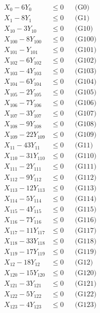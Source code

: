 \documentclass[a4paper,10pt]{article}
\begin{document}
\allowdisplaybreaks
{\small\begin{align}
X_{0} - 6Y_{0} &\leq 0 && \text{(G0)} \\
X_{1} - 8Y_{1} &\leq 0 && \text{(G1)} \\
X_{10} - 3Y_{10} &\leq 0 && \text{(G10)} \\
X_{100} - 8Y_{100} &\leq 0 && \text{(G100)} \\
X_{101} - Y_{101} &\leq 0 && \text{(G101)} \\
X_{102} - 6Y_{102} &\leq 0 && \text{(G102)} \\
X_{103} - 4Y_{103} &\leq 0 && \text{(G103)} \\
X_{104} - 6Y_{104} &\leq 0 && \text{(G104)} \\
X_{105} - 2Y_{105} &\leq 0 && \text{(G105)} \\
X_{106} - 7Y_{106} &\leq 0 && \text{(G106)} \\
X_{107} - 3Y_{107} &\leq 0 && \text{(G107)} \\
X_{108} - 9Y_{108} &\leq 0 && \text{(G108)} \\
X_{109} - 22Y_{109} &\leq 0 && \text{(G109)} \\
X_{11} - 43Y_{11} &\leq 0 && \text{(G11)} \\
X_{110} - 31Y_{110} &\leq 0 && \text{(G110)} \\
X_{111} - 2Y_{111} &\leq 0 && \text{(G111)} \\
X_{112} - 9Y_{112} &\leq 0 && \text{(G112)} \\
X_{113} - 12Y_{113} &\leq 0 && \text{(G113)} \\
X_{114} - 5Y_{114} &\leq 0 && \text{(G114)} \\
X_{115} - 4Y_{115} &\leq 0 && \text{(G115)} \\
\allowbreak
X_{116} - 7Y_{116} &\leq 0 && \text{(G116)} \\
X_{117} - 11Y_{117} &\leq 0 && \text{(G117)} \\
X_{118} - 33Y_{118} &\leq 0 && \text{(G118)} \\
X_{119} - 17Y_{119} &\leq 0 && \text{(G119)} \\
X_{12} - 18Y_{12} &\leq 0 && \text{(G12)} \\
X_{120} - 15Y_{120} &\leq 0 && \text{(G120)} \\
X_{121} - 3Y_{121} &\leq 0 && \text{(G121)} \\
X_{122} - 5Y_{122} &\leq 0 && \text{(G122)} \\
X_{123} - 4Y_{123} &\leq 0 && \text{(G123)} \\

\end{align}}
\end{document}
